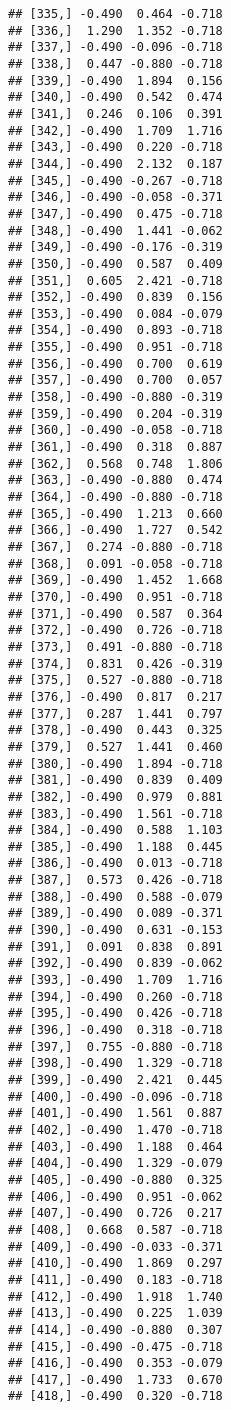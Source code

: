 \documentclass[
]{article}
\begin{document}
\begin{verbatim}
## [335,] -0.490  0.464 -0.718
## [336,]  1.290  1.352 -0.718
## [337,] -0.490 -0.096 -0.718
## [338,]  0.447 -0.880 -0.718
## [339,] -0.490  1.894  0.156
## [340,] -0.490  0.542  0.474
## [341,]  0.246  0.106  0.391
## [342,] -0.490  1.709  1.716
## [343,] -0.490  0.220 -0.718
## [344,] -0.490  2.132  0.187
## [345,] -0.490 -0.267 -0.718
## [346,] -0.490 -0.058 -0.371
## [347,] -0.490  0.475 -0.718
## [348,] -0.490  1.441 -0.062
## [349,] -0.490 -0.176 -0.319
## [350,] -0.490  0.587  0.409
## [351,]  0.605  2.421 -0.718
## [352,] -0.490  0.839  0.156
## [353,] -0.490  0.084 -0.079
## [354,] -0.490  0.893 -0.718
## [355,] -0.490  0.951 -0.718
## [356,] -0.490  0.700  0.619
## [357,] -0.490  0.700  0.057
## [358,] -0.490 -0.880 -0.319
## [359,] -0.490  0.204 -0.319
## [360,] -0.490 -0.058 -0.718
## [361,] -0.490  0.318  0.887
## [362,]  0.568  0.748  1.806
## [363,] -0.490 -0.880  0.474
## [364,] -0.490 -0.880 -0.718
## [365,] -0.490  1.213  0.660
## [366,] -0.490  1.727  0.542
## [367,]  0.274 -0.880 -0.718
## [368,]  0.091 -0.058 -0.718
## [369,] -0.490  1.452  1.668
## [370,] -0.490  0.951 -0.718
## [371,] -0.490  0.587  0.364
## [372,] -0.490  0.726 -0.718
## [373,]  0.491 -0.880 -0.718
## [374,]  0.831  0.426 -0.319
## [375,]  0.527 -0.880 -0.718
## [376,] -0.490  0.817  0.217
## [377,]  0.287  1.441  0.797
## [378,] -0.490  0.443  0.325
## [379,]  0.527  1.441  0.460
## [380,] -0.490  1.894 -0.718
## [381,] -0.490  0.839  0.409
## [382,] -0.490  0.979  0.881
## [383,] -0.490  1.561 -0.718
## [384,] -0.490  0.588  1.103
## [385,] -0.490  1.188  0.445
## [386,] -0.490  0.013 -0.718
## [387,]  0.573  0.426 -0.718
## [388,] -0.490  0.588 -0.079
## [389,] -0.490  0.089 -0.371
## [390,] -0.490  0.631 -0.153
## [391,]  0.091  0.838  0.891
## [392,] -0.490  0.839 -0.062
## [393,] -0.490  1.709  1.716
## [394,] -0.490  0.260 -0.718
## [395,] -0.490  0.426 -0.718
## [396,] -0.490  0.318 -0.718
## [397,]  0.755 -0.880 -0.718
## [398,] -0.490  1.329 -0.718
## [399,] -0.490  2.421  0.445
## [400,] -0.490 -0.096 -0.718
## [401,] -0.490  1.561  0.887
## [402,] -0.490  1.470 -0.718
## [403,] -0.490  1.188  0.464
## [404,] -0.490  1.329 -0.079
## [405,] -0.490 -0.880  0.325
## [406,] -0.490  0.951 -0.062
## [407,] -0.490  0.726  0.217
## [408,]  0.668  0.587 -0.718
## [409,] -0.490 -0.033 -0.371
## [410,] -0.490  1.869  0.297
## [411,] -0.490  0.183 -0.718
## [412,] -0.490  1.918  1.740
## [413,] -0.490  0.225  1.039
## [414,] -0.490 -0.880  0.307
## [415,] -0.490 -0.475 -0.718
## [416,] -0.490  0.353 -0.079
## [417,] -0.490  1.733  0.670
## [418,] -0.490  0.320 -0.718

\end{verbatim}
\end{document}

